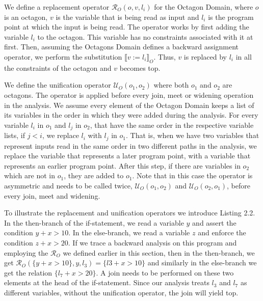 \documentclass[10pt]{report}
\begin{document}
We define a replacement operator $ \mathcal{R}_{O}(o, v, l_{i}) $ for the Octagon Domain, where $ o $ is an octagon, $ v $ is the variable that is being read as input and $ l_{i} $ is the program point at which the input is being read. The operator works by first adding the variable $ l_{i} $ to the octagon. This variable has no constraints associated with it at first. Then, assuming the Octagons Domain defines a backward assignment operator, we perform the substitution $ \llbracket v := l_{i} \rrbracket_{O} $. Thus, $ v $ is replaced by $ l_{i} $ in all the constraints of the octagon and $ v $ becomes top. 


We define the unification operator $ \mathcal{U}_{O}(o_{1}, o_{2}) $ where both $ o_{1} $ and $ o_{2} $ are octagons. The operator is applied before every join, meet or widening operation in the analysis. We assume every element of the Octagon Domain keeps a list of its variables in the order in which they were added during the analysis. For every variable $ l_{i} $ in $ o_{1} $ and $ l_{j} $ in $ o_{2} $, that have the same order in the respective variable lists, if $ j < i $, we replace $ l_{i} $ with $ l_{j} $ in $ o_{1} $. That is, when we have two variables that represent inputs read in the same order in two different paths in the analysis, we replace the variable that represents a later program point, with a variable that represents an earlier program point. After this step, if there are variables in $ o_{2} $ which are not in $ o_{1} $, they are added to $ o_{1} $. Note that in this case the operator is asymmetric and needs to be called twice, $ \mathcal{U}_{O}(o_{1}, o_{2}) $ and $ \mathcal{U}_{O}(o_{2}, o_{1}) $, before every join, meet and widening. 


To illustrate the replacement and unification operators we introduce Listing 2.2. In the then-branch of the if-statement, we read a variable $ y $ and assert the condition $ y + x > 10 $. In the else-branch, we read a variable $ z $ and enforce the condition $ z + x > 20 $. If we trace a backward analysis on this program and employing the $ \mathcal{R}_{O} $ we defined earlier in this section, then in the then-branch, we get $\mathcal{R}_{O}(\lbrace y + x > 10\rbrace, y, l_{3}) = \lbrace l3 + x > 10 \rbrace$ and similarly in the else-branch we get the relation $ \lbrace l_{7} + x > 20 \rbrace$. A join needs to be performed on these two elements at the head of the if-statement. Since our analysis treats $ l_{3} $ and $ l_{7} $ as different variables, without the unification operator, the join will yield top. 
\end{document}
